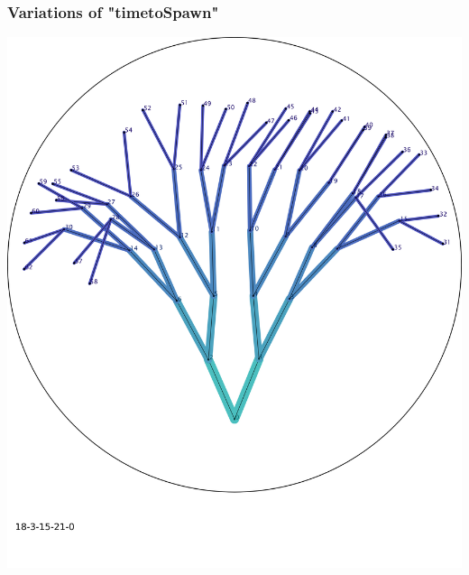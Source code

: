 \documentclass{scrartcl}
\newcommand{\imgSize}{0.46}
\begin{document}
\newpage
\subsubsection{Variations of "timetoSpawn"}

\begin{minipage}[t]{\imgSize\textwidth}
\includegraphics[width=\textwidth]{img_18-3-15-21-0}
\end{minipage}
\hspace{0.5cm}
\end{document}
